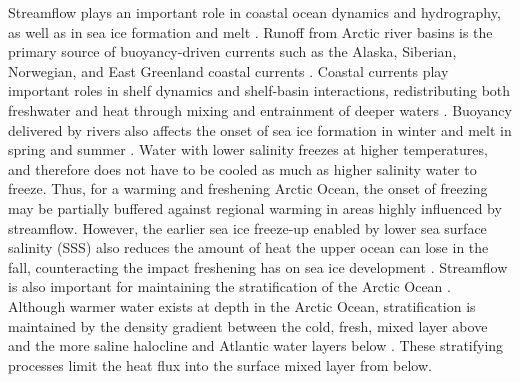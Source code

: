 \documentclass[jgrga, draft]{agutex}
\begin{document}
\begin{article}
Streamflow plays an important role in coastal ocean dynamics and hydrography, as well as in sea ice formation and melt \citep{Weatherly_1996,Rabe_2011,Fichot_2013}.
Runoff from Arctic river basins is the primary source of buoyancy-driven currents such as the Alaska, Siberian, Norwegian, and East Greenland coastal currents \citep[e.g.][]{Morison_2000,Boyd_2002,McGeehan_2012,Myers_2005}.
Coastal currents play important roles in shelf dynamics and shelf-basin interactions, redistributing both freshwater and heat through mixing and entrainment of deeper waters \citep[e.g.][]{Carmack_1989,Rudels_1999,Ekwurzel_2001}.
Buoyancy delivered by rivers also affects the onset of sea ice formation in winter and melt in spring and summer \citep[e.g.][]{Weatherly_1996}.
Water with lower salinity freezes at higher temperatures, and therefore does not have to be cooled as much as higher salinity water to freeze.
Thus, for a warming and freshening Arctic Ocean, the onset of freezing may be partially buffered against regional warming in areas highly influenced by streamflow.
However, the earlier sea ice freeze-up enabled by lower sea surface salinity (SSS) also reduces the amount of heat the upper ocean can lose in the fall, counteracting the impact freshening has on sea ice development \citep{Weatherly_1996,Morison_2012}.
Streamflow is also important for maintaining the stratification of the Arctic Ocean \citep{Nummelin_2015}.
Although warmer water exists at depth in the Arctic Ocean, stratification is maintained by the density gradient between the cold, fresh, mixed layer above and the more saline halocline and Atlantic water layers below \citep{Serreze_2006}.
These stratifying processes limit the heat flux into the surface mixed layer from below.


\end{article}
\end{document}
